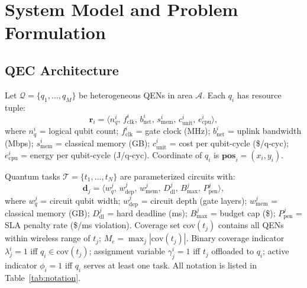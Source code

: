 \documentclass[10pt,twocolumn]{article}
\begin{document}
\section{System Model and Problem Formulation}

\subsection{QEC Architecture}
Let $\mathcal{Q}=\{q_1,\ldots,q_M\}$ be heterogeneous QENs in area $\mathcal{A}$. Each $q_i$ has resource tuple:
\begin{equation}
\mathbf{r}_i=\langle n^i_q,\,f^i_{\mathrm{clk}},\,b^i_{\mathrm{net}},\,s^i_{\mathrm{mem}},\,c^i_{\mathrm{unit}},\,e^i_{\mathrm{cpu}}\rangle,
\end{equation}
where $n^i_q$ = logical qubit count; $f^i_{\mathrm{clk}}$ = gate clock (MHz); $b^i_{\mathrm{net}}$ = uplink bandwidth (Mbps); $s^i_{\mathrm{mem}}$ = classical memory (GB); $c^i_{\mathrm{unit}}$ = cost per qubit-cycle (\$/q-cyc); $e^i_{\mathrm{cpu}}$ = energy per qubit-cycle (J/q-cyc). Coordinate of $q_i$ is $\mathbf{pos}_i=(x_i,y_i)$.

Quantum tasks $\mathcal{T}=\{t_1,\ldots,t_N\}$ are parameterized circuits with:
\begin{equation}
\mathbf{d}_j=\langle w^j_q,\,w^j_{\mathrm{dep}},\,w^j_{\mathrm{mem}},\,D^j_{\mathrm{dl}},\,B^j_{\mathrm{max}},\,P^j_{\mathrm{pen}}\rangle,
\end{equation}
where $w^j_q$ = circuit qubit width; $w^j_{\mathrm{dep}}$ = circuit depth (gate layers); $w^j_{\mathrm{mem}}$ = classical memory (GB); $D^j_{\mathrm{dl}}$ = hard deadline (ms); $B^j_{\mathrm{max}}$ = budget cap (\$); $P^j_{\mathrm{pen}}$ = SLA penalty rate (\$/ms violation). Coverage set $\mathrm{cov}(t_j)$ contains all QENs within wireless range of $t_j$; $M_e=\max_j|\mathrm{cov}(t_j)|$. Binary coverage indicator $\lambda^i_j=1$ iff $q_i\in\mathrm{cov}(t_j)$; assignment variable $\gamma^i_j=1$ iff $t_j$ offloaded to $q_i$; active indicator $\phi_i=1$ iff $q_i$ serves at least one task. All notation is listed in Table~\ref{tab:notation}.
\end{document}
